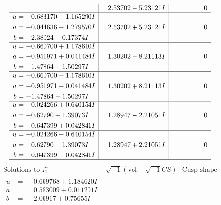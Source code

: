 \documentclass[1p]{elsarticle_modified}
\theoremstyle{definition}
\newcommand{\I}{\sqrt{-1}}
\begin{document}
$$\begin{array}{c|c|c}
 & \phantom{-}2.53702 - 5.23121 I & \phantom{-0.000000 } 0 \\ \hline\begin{aligned}
u &= -0.683170 - 1.165290 I \\
a &= -0.044636 - 1.279570 I \\
b &= \phantom{-}2.38024 - 0.17374 I\end{aligned}
 & \phantom{-}2.53702 + 5.23121 I & \phantom{-0.000000 } 0 \\ \hline\begin{aligned}
u &= -0.660700 + 1.178610 I \\
a &= -0.951971 + 0.041484 I \\
b &= -1.47864 + 1.50297 I\end{aligned}
 & \phantom{-}1.30202 - 8.21113 I & \phantom{-0.000000 } 0 \\ \hline\begin{aligned}
u &= -0.660700 - 1.178610 I \\
a &= -0.951971 - 0.041484 I \\
b &= -1.47864 - 1.50297 I\end{aligned}
 & \phantom{-}1.30202 + 8.21113 I & \phantom{-0.000000 } 0 \\ \hline\begin{aligned}
u &= -0.024266 + 0.640154 I \\
a &= -0.62790 + 1.39073 I \\
b &= \phantom{-}0.647399 + 0.042841 I\end{aligned}
 & \phantom{-}1.28947 - 2.21051 I & \phantom{-0.000000 } 0 \\ \hline\begin{aligned}
u &= -0.024266 - 0.640154 I \\
a &= -0.62790 - 1.39073 I \\
b &= \phantom{-}0.647399 - 0.042841 I\end{aligned}
 & \phantom{-}1.28947 + 2.21051 I & \phantom{-0.000000 } 0\\
 \hline 
 \end{array}$$\newpage$$\begin{array}{c|c|c}  
\text{Solutions to }I^u_{1}& \I (\text{vol} + \sqrt{-1}CS) & \text{Cusp shape}\\
 \hline 
\begin{aligned}
u &= \phantom{-}0.669768 + 1.184620 I \\
a &= \phantom{-}0.583009 + 0.011201 I \\
b &= \phantom{-}2.06917 + 0.75655 I\end{aligned}

\end{array}$$
\end{document}
